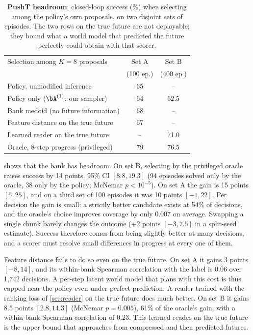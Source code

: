 \begin{table}[t]
\centering
\small
\setlength{\tabcolsep}{4pt}
\begin{tabular}{@{}lcc@{}}
\toprule
Selection among $K{=}8$ proposals & Set A & Set B \\
 & \scriptsize(100 ep.) & \scriptsize(400 ep.) \\
\midrule
Policy, unmodified inference & 65 & -- \\
Policy only ($\bA^{(1)}$, our sampler) & 64 & 62.5 \\
Bank medoid (no future information) & 68 & -- \\
Feature distance on the true future & 67 & -- \\
Learned reader on the true future & -- & 71.0 \\
Oracle, 8-step progress (privileged) & 79 & 76.5 \\
\bottomrule
\end{tabular}
\caption{\textbf{PushT headroom}: closed-loop success (\%) when selecting among the policy's own proposals, on two disjoint sets of episodes. The two rows on the true future are not deployable; they bound what a world model that predicted the future perfectly could obtain with that scorer.}
\label{tab:headroom}
\end{table}

 shows that the bank has headroom.
On set B, selecting by the privileged oracle raises success by 14 points, 95\% CI $[8.8,19.3]$ (94 episodes solved only by the oracle, 38 only by the policy; McNemar $p{<}10^{-5}$).
On set A the gain is 15 points $[5,25]$, and on a third set of 100 episodes it was 10 points $[-1,22]$.
Per decision the gain is small: a strictly better candidate exists at 54\% of decisions, and the oracle's choice improves coverage by only 0.007 on average.
Swapping a single chunk barely changes the outcome (+2 points $[-3,7.5]$ in a split-seed estimate).
Success therefore comes from being slightly better at many decisions, and a scorer must resolve small differences in progress at every one of them.

Feature distance fails to do so even on the true future.
On set A it gains 3 points $[-8,14]$, and its within-bank Spearman correlation with the label is 0.06 over 1{,}742 decisions.
A per-step latent world model that plans with this cost is thus capped near the policy even under perfect prediction.
A reader trained with the ranking loss of \cref{sec:reader} on the true future does much better.
On set B it gains 8.5 points $[2.8,14.3]$ (McNemar $p{=}0.005$), 61\% of the oracle's gain, with a within-bank Spearman correlation of 0.23.
This learned reader on the true future is the upper bound that \method approaches from compressed and then predicted futures.

